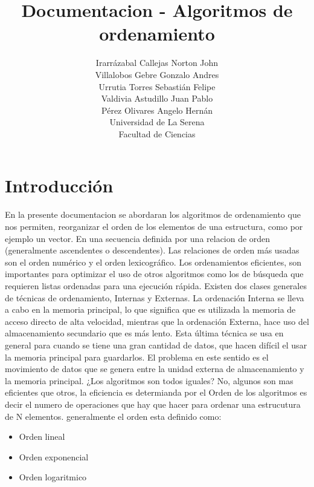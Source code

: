 \documentclass[12pt,letterpaper]{article}
\author{Irarrázabal Callejas Norton John\\Villalobos Gebre Gonzalo Andres\\Urrutia Torres Sebastián Felipe\\Valdivia Astudillo Juan Pablo\\Pérez Olivares Angelo Hernán\\Universidad de La Serena\\Facultad de Ciencias}
\title{Documentacion - Algoritmos de ordenamiento }
\date{}
\begin{document}
\maketitle
\begin{figure} [H]
\begin {center}
\end {center}
\end{figure}
\newpage
\tableofcontents
\newpage
\section{Introducción}
\vskip 0.4cm
En la presente documentacion se abordaran los algoritmos de ordenamiento que nos permiten, reorganizar el orden de los elementos de una estructura, como por ejemplo un vector. En una secuencia definida por una relacion de orden (generalmente ascendentes o descendentes). Las relaciones de orden más usadas son el orden numérico y el orden lexicográfico. Los ordenamientos eficientes, son importantes para optimizar el uso de otros algoritmos como los de búsqueda que requieren listas ordenadas para una ejecución rápida.
 \vskip 0.4cm
Existen dos clases generales de técnicas de ordenamiento, Internas y Externas. La ordenación Interna se lleva a cabo en la memoria principal, lo que significa que es utilizada la memoria de acceso directo de alta velocidad, mientras que la ordenación Externa, hace uso del almacenamiento secundario que es más lento. Esta última técnica se usa en general para cuando se tiene una gran cantidad de datos, que hacen difícil el usar la memoria principal para guardarlos. El problema en este sentido es el movimiento de datos que se genera entre la unidad
externa de almacenamiento y la memoria principal. 
 \vskip 0.4cm
¿Los algoritmos son todos iguales? No, algunos son mas eficientes que otros, la eficiencia es determianda por el Orden de los algoritmos es decir el numero de operaciones que hay que hacer para ordenar una estrucutura de N elementos. generalmente el orden esta definido como:
 \vskip 0.4cm
\begin{itemize}
\item Orden lineal
\item Orden exponencial
\item Orden logaritmico
\end{itemize}
\end{document}
